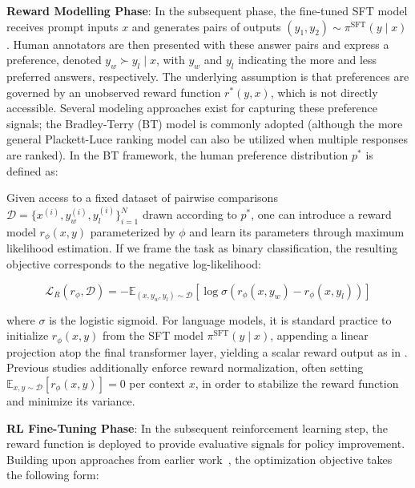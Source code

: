 \textbf{Reward Modelling Phase}: In the subsequent phase, the fine-tuned SFT model receives prompt inputs $x$ and generates pairs of outputs $(y_1, y_2)\sim \pi^\text{SFT}(y \mid x)$. Human annotators are then presented with these answer pairs and express a preference, denoted $y_w\succ y_l \mid x$, with $y_w$ and $y_l$ indicating the more and less preferred answers, respectively. The underlying assumption is that preferences are governed by an unobserved reward function $r^*(y, x)$, which is not directly accessible. Several modeling approaches exist for capturing these preference signals; the Bradley-Terry (BT) model \cite{bradley1952rankanalysis} is commonly adopted (although the more general Plackett-Luce ranking model \citep{plackett1975analysis, luce2012individual} can also be utilized when multiple responses are ranked). In the BT framework, the human preference distribution $p^*$ is defined as:

Given access to a fixed dataset of pairwise comparisons $\mathcal{D}=\bigl\{x^{(i)}, y_w^{(i)}, y_l^{(i)}\bigr\}_{i=1}^N$ drawn according to $p^*$, one can introduce a reward model $r_{\phi}(x, y)$ parameterized by $\phi$ and learn its parameters through maximum likelihood estimation. If we frame the task as binary classification, the resulting objective corresponds to the negative log-likelihood:

\begin{equation}\label{eq:reward_model}
    \mathcal{L}_R(r_{\phi}, \mathcal{D}) = -\mathbb{E}_{(x, y_w, y_l)\sim \mathcal{D}}\left[\log \sigma\left(r_{\phi}(x, y_w) - r_{\phi}(x, y_l)\right)\right]
\end{equation}

where $\sigma$ is the logistic sigmoid. For language models, it is standard practice to initialize $r_{\phi}(x, y)$ from the SFT model $\pi^\text{SFT}(y \mid x)$, appending a linear projection atop the final transformer layer, yielding a scalar reward output as in \cite{ziegler2020finetuning}. Previous studies additionally enforce reward normalization, often setting  $\mathbb{E}_{x,y\sim \mathcal{D}}\left[r_\phi(x, y)\right]=0$ per context $x$, in order to stabilize the reward function and minimize its variance.

\textbf{RL Fine-Tuning Phase}: In the subsequent reinforcement learning step, the reward function is deployed to provide evaluative signals for policy improvement. Building upon approaches from earlier work~\citep{jaques2017sequence, jaques2020human}, the optimization objective takes the following form:

